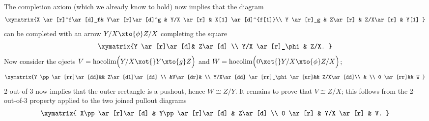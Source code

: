 The completion axiom (which we already know to hold) now implies that the diagram
\[
\xymatrix{%
X \ar[r]^f\ar[d]_f& Y\ar[r]\ar[d]^g & Y/X \ar[r] & X[1] \ar[d]^{f[1]}\\
Y \ar[r]_g & Z\ar[r] & Z/X\ar[r] & Y[1]
}
\]
can be completed with an arrow $Y/X \xto{\phi} Z/X$ completing the square
\[
\xymatrix{%
Y \ar[r]\ar[d]& Z\ar[d] \\
Y/X \ar[r]_\phi & Z/X.
}
\]
Now consider the ojects $V={\rm hocolim}\Big( Y/X \xot{} Y \xto{g} Z \Big)$ and $W={\rm hocolim}\Big( 0\xot{} Y/X \xto{\phi}Z/X \Big)$; 
\[
\xymatrix{%
Y \pp \ar[rr]\ar[dd]&& Z\ar[dl]\ar[dd] \\
&V\ar[dr]& \\
Y/X\ar[dd] \ar[rr]_\phi\ar[ur]&& Z/X\ar[dd]\\
& \\
0 \ar[rr]&& W
}
\]
2-out-of-3 now implies that the outer rectangle is a pushout, hence $W\cong Z/Y$. It remains to prove that $V\cong Z/X$; this follows from the 2-out-of-3 property applied to  the two joined pullout diagrams
\[
\xymatrix{
X\pp \ar[r]\ar[d] & Y\pp \ar[r]\ar[d] & Z\ar[d] \\
0 \ar[r] & Y/X \ar[r] & V.
}
\]
